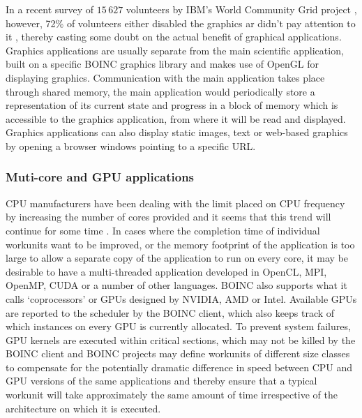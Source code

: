   In a  recent survey of $15\,627$ volunteers by IBM's World Community Grid project \cite{wcg}, however, 72\% of volunteers either disabled the graphics ar didn't pay attention to it  \cite{wcg2013}, thereby casting some doubt on the actual benefit of graphical applications. Graphics applications are usually separate from the main scientific application, built on  a specific  BOINC graphics library and makes use of OpenGL \cite{opengl} for displaying graphics. Communication with the main application takes place through shared memory, the main application would periodically store a representation of its current state and progress in  a block of memory which is accessible to the graphics application, from where it will be read and displayed. Graphics applications can also display static images, text or web-based graphics by opening a browser windows pointing to a specific URL.

\subsubsection{Muti-core and GPU applications}
CPU manufacturers have been dealing with the limit placed on CPU frequency by increasing the number of cores provided and it seems that this trend will continue for some time \cite{spu}. In cases where the completion time of individual workunits want to be improved, or the memory footprint of the application is too large to allow a separate copy of the application to run on every core, it may be desirable to have a multi-threaded application developed in OpenCL, MPI, OpenMP, CUDA or a number of other languages. BOINC also supports what it calls `coprocessors' or GPUs designed by NVIDIA, AMD or Intel. Available GPUs are reported to the scheduler by the BOINC client, which also keeps track of which instances on every GPU is currently allocated. To prevent system failures, GPU kernels are  executed within critical sections, which may not be killed by the BOINC client and  BOINC projects may define workunits of different size classes to compensate for the potentially dramatic difference in speed between CPU and GPU versions of the same applications and thereby ensure that a typical workunit will take approximately the same amount of time irrespective of the architecture on which it is executed.

